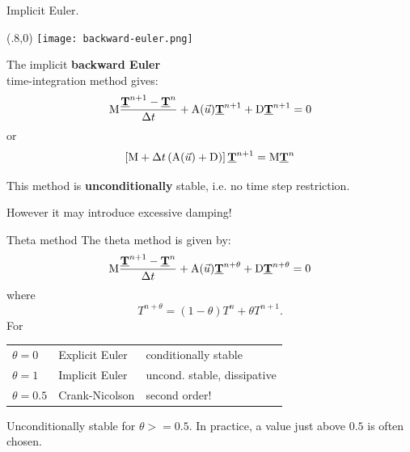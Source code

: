 \documentclass[12pt]{beamer}
\newcommand\mat[1]{\mathrm{#1}}
\newcommand\dv[1]{\underline{\bf #1}} %
\newcommand\vT{\dv T}
\renewcommand\emph[1]{{\bf #1}}
\begin{document}
\begin{frame}{Implicit Euler\hspace{10ex}.}
  \begin{textblock}{0.3}(.8,0)
     \texttt{[image: backward-euler.png]}
  \end{textblock}
  \begin{minipage}{0.7\textwidth}
  The implicit \emph{backward Euler} \\
  time-integration method gives:
  \begin{equation*}
    \mat M\frac{\vT^{n+1}-\vT^n}{\Delta t} 
    + \mat A(\vec u) \vT^{n+1} + \mat D \vT^{n+1} = 0
  \end{equation*}
  or
  \begin{equation*}
    \left[ \mat M + \Delta t\left(\mat A(\vec u) + \mat D\right) \right] \vT^{n+1} = \mat M \vT^n 
  \end{equation*}
  \end {minipage}

  \vspace{1ex}
  This method is \emph{unconditionally} stable, i.e. no time step restriction.

  \vspace{1em}
  However it may introduce excessive damping!
\end{frame}

\begin{frame}{Theta method}
  The theta method is given by:
  \begin{equation*}
    \mat M\frac{\vT^{n+1}-\vT^n}{\Delta t} 
    + \mat A(\vec u) \vT^{n+\theta} + \mat D
    \vT^{n+\theta} = 0
  \end{equation*}
  where
  \begin{equation*}
    T^{n+\theta}=(1-\theta) T^n + \theta T^{n+1}.
  \end{equation*}
  For %
  \begin{tabular}{lll}
    $\theta=0$ & Explicit Euler & conditionally stable \\
    $\theta=1$ & Implicit Euler & uncond. stable, dissipative\hspace{-4em}\;\\
    $\theta=0.5$ & Crank-Nicolson & second order!
  \end{tabular}

  \vspace{1em}
  Unconditionally stable for $\theta>=0.5$. In practice, a value just above
  $0.5$ is often chosen.
\end{frame}
\end{document}

